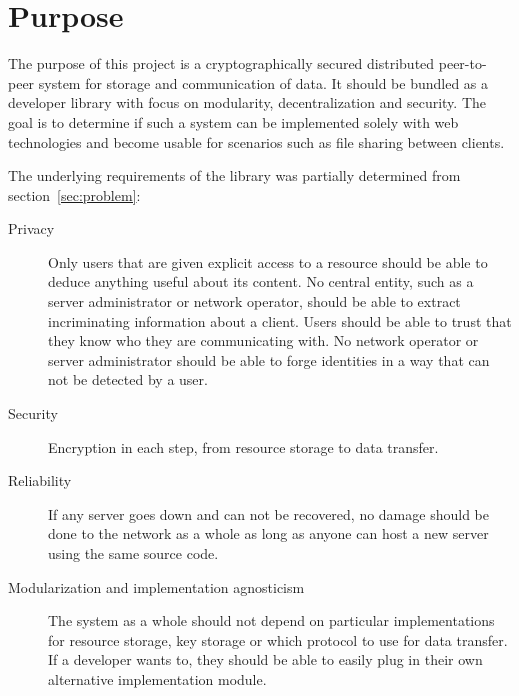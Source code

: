 \section{Purpose}\label{sec:purpose}

The purpose of this project is a cryptographically secured distributed peer-to-peer system for storage and communication of data. It should be bundled as a developer library with focus on modularity, decentralization and security. The goal is to determine if such a system can be implemented solely with web technologies and become usable for scenarios such as file sharing between clients.

The underlying requirements of the library was partially determined from section~\ref{sec:problem}:

\begin{description}
  \item[Privacy] Only users that are given explicit access to a resource should be able to deduce anything useful about its content. No central entity, such as a server administrator or network operator, should be able to extract incriminating information about a client. Users should be able to trust that they know who they are communicating with. No network operator or server administrator should be able to forge identities in a way that can not be detected by a user.

\item[Security] Encryption in each step, from resource storage to data transfer.

\item[Reliability] If any server goes down and can not be recovered, no damage should be done to the network as a whole as long as anyone can host a new server using the same source code.

\item[Modularization and implementation agnosticism] The system as a whole should not depend on particular implementations for resource storage, key storage or which protocol to use for data transfer. If a developer wants to, they should be able to easily plug in their own alternative implementation module.

\end{description}

